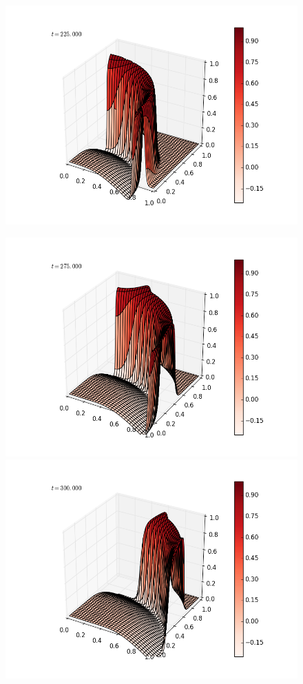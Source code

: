 \documentclass[12pt]{article}
\begin{document}
\begin{enumerate}[(a)]
\begin{figure}[H]
\includegraphics[scale=0.4]{partb_fast_frames/partb_fast_fig11.png}
\end{figure}
\begin{figure}[H]
\includegraphics[scale=0.4]{partb_fast_frames/partb_fast_fig13.png}%
\includegraphics[scale=0.4]{partb_fast_frames/partb_fast_fig14.png}
\end{figure}


\end{enumerate}
\end{document}
